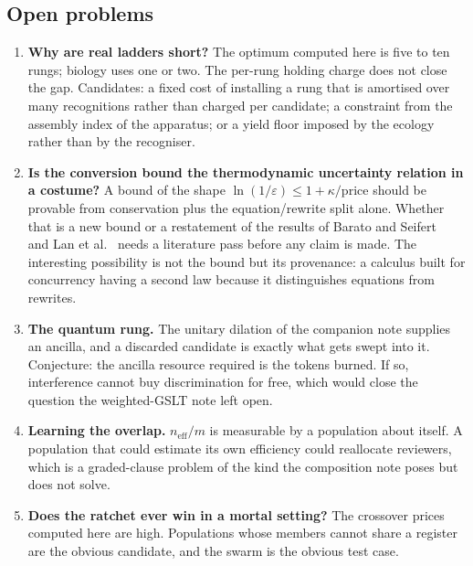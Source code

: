 \documentclass[11pt]{article}
\theoremstyle{plain}
\theoremstyle{definition}
\theoremstyle{remark}
\begin{document}
\subsection{Open problems}

\begin{enumerate}[leftmargin=*,label=O\arabic*.]
\item\label{op:short} \textbf{Why are real ladders short?} The optimum computed
  here is five to ten rungs; biology uses one or two. The per-rung holding
  charge does not close the gap. Candidates: a fixed cost of installing a
  rung that is amortised over many recognitions rather than charged per
  candidate; a constraint from the assembly index of the apparatus; or a
  yield floor imposed by the ecology rather than by the recogniser.
\item \textbf{Is the conversion bound the thermodynamic uncertainty relation
  in a costume?} A bound of the shape $\ln(1/\varepsilon) \leq 1 + \kappa/
  \mathrm{price}$ should be provable from conservation plus the
  equation/rewrite split alone. Whether that is a new bound or a restatement
  of the results of Barato and Seifert~\cite{BS2015} and
  Lan et al.~\cite{Lan2012} needs a literature pass before any claim is made.
  The interesting possibility is not the bound but its provenance: a calculus
  built for concurrency having a second law because it distinguishes equations
  from rewrites.
\item \textbf{The quantum rung.} The unitary dilation of the companion note
  supplies an ancilla, and a discarded candidate is exactly what gets swept
  into it. Conjecture: the ancilla resource required is the tokens burned. If
  so, interference cannot buy discrimination for free, which would close the
  question the weighted-GSLT note left open.
\item \textbf{Learning the overlap.} $n_{\mathrm{eff}}/m$ is measurable by a
  population about itself. A population that could estimate its own
  efficiency could reallocate reviewers, which is a graded-clause problem of
  the kind the composition note poses but does not solve.
\item \textbf{Does the ratchet ever win in a mortal setting?} The crossover
  prices computed here are high. Populations whose members cannot share a
  register are the obvious candidate, and the swarm is the obvious test case.
\end{enumerate}
\end{document}
